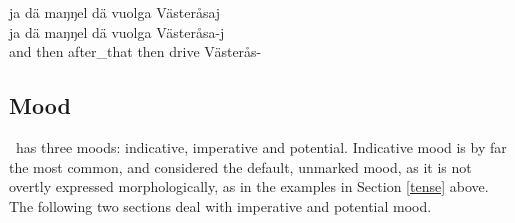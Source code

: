 \z
\ea\label{presentEx3}%
\glll	ja dä maŋŋel dä vuolga Västeråsaj\\
	ja dä maŋŋel dä vuolga Västeråsa-j\\
	and then after\_that then drive\BS{} Västerås-\\\nopagebreak
{}	
\z
{}


\subsection{Mood}\label{mood}
\PS\ has three moods: indicative, imperative and potential. Indicative mood is by far the most common, and considered the default, unmarked mood, as it is not overtly expressed morphologically, as in the examples in Section \ref{tense} above. 
The following two sections deal with imperative and potential mood. %

